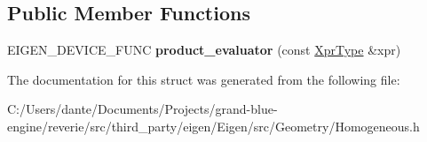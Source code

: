 \subsection*{Public Member Functions}
\begin{DoxyCompactItemize}
\item 
\mbox{\label{struct_eigen_1_1internal_1_1product__evaluator_3_01_product_3_01_lhs_00_01_rhs_00_01_lazy_produc94c394146b0a8c54b74b1b296d175015_a4908c0201a2ae11b4da54ca8cd1154ea}} 
E\+I\+G\+E\+N\+\_\+\+D\+E\+V\+I\+C\+E\+\_\+\+F\+U\+NC {\bfseries product\+\_\+evaluator} (const \mbox{\hyperlink{class_eigen_1_1_product}{Xpr\+Type}} \&xpr)
\end{DoxyCompactItemize}


The documentation for this struct was generated from the following file\+:\begin{DoxyCompactItemize}
\item 
C\+:/\+Users/dante/\+Documents/\+Projects/grand-\/blue-\/engine/reverie/src/third\+\_\+party/eigen/\+Eigen/src/\+Geometry/Homogeneous.\+h\end{DoxyCompactItemize}

